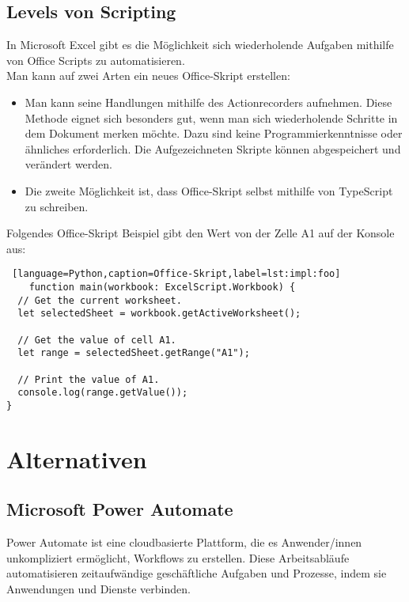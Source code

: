 \newpage

\subsection*{Levels von Scripting}

In Microsoft Excel gibt es die Möglichkeit sich wiederholende Aufgaben mithilfe 
von Office Scripts zu automatisieren.
\\
Man kann auf zwei Arten ein neues Office-Skript erstellen:
\begin{itemize}
    \item Man kann seine Handlungen mithilfe des Actionrecorders aufnehmen. 
    Diese Methode eignet sich besonders gut, wenn man sich wiederholende 
    Schritte in dem Dokument merken möchte. Dazu sind keine Programmierkenntnisse 
    oder ähnliches erforderlich. Die Aufgezeichneten Skripte können 
    abgespeichert und verändert werden.
    \item Die zweite Möglichkeit ist, dass Office-Skript selbst mithilfe 
    von TypeScript zu schreiben.
\end{itemize}

Folgendes Office-Skript Beispiel gibt den Wert von der Zelle A1 auf der Konsole aus:

\begin{lstlisting} [language=Python,caption=Office-Skript,label=lst:impl:foo]
    function main(workbook: ExcelScript.Workbook) {
  // Get the current worksheet.
  let selectedSheet = workbook.getActiveWorksheet();

  // Get the value of cell A1.
  let range = selectedSheet.getRange("A1");
  
  // Print the value of A1.
  console.log(range.getValue());
}
\end{lstlisting}

\newpage

\section{Alternativen}

\subsection*{Microsoft Power Automate}

Power Automate ist eine cloudbasierte Plattform, die es Anwender/innen unkompliziert ermöglicht, 
Workflows zu erstellen. Diese Arbeitsabläufe automatisieren zeitaufwändige 
geschäftliche Aufgaben und Prozesse, indem sie Anwendungen und Dienste verbinden.\\

